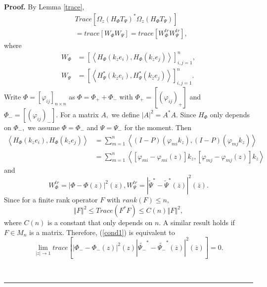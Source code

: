 \documentclass{article}%
\newenvironment{proof}[1][Proof]{\noindent\textbf{#1.} }{\ \rule{0.5em}{0.5em}}
\begin{document}
\begin{proof}
By Lemma \ref{trace},
\begin{align*}
&  Trace\left[  \Omega_{z}(H_{\Phi}T_{\Psi})^{\ast}\Omega_{z}(H_{\Phi}T_{\Psi
})\right] \\
&  =trace\left[  W_{\Phi}W_{\Psi}\right]  =trace\left[  W_{\Phi}^{tr}W_{\Psi
}^{tr}\right]  ,
\end{align*}
where%
\begin{align*}
W_{\Phi}  &  =\left[  \left\langle H_{\Phi}\left(  k_{z}e_{i}\right)
,H_{\Phi}\left(  k_{z}e_{j}\right)  \right\rangle \right]  _{i,j=1}^{n},\\
W_{\Psi}  &  =\left[  \left\langle H_{\Psi}^{\ast}\left(  k_{\overline{z}%
}e_{i}\right)  ,H_{\Psi}^{\ast}\left(  k_{\overline{z}}e_{j}\right)
\right\rangle \right]  _{i,j=1}^{n}.
\end{align*}
Write $\Phi=\left[  \varphi_{ij}\right]  _{n\times n}$ as $\Phi=\Phi_{+}%
+\Phi_{-}$ with $\Phi_{+}=\left[  \left(  \varphi_{ij}\right)  _{+}\right]  $
and $\Phi_{-}=\left[  \left(  \varphi_{ij}\right)  _{-}\right]  .$ For a
matrix $A,$ we define $\left\vert A\right\vert ^{2}=A^{\ast}A.$ Since
$H_{\Phi}$ only depends on $\Phi_{-},$ we assume $\Phi=\Phi_{-}$ and
$\Psi=\Psi_{-}$ for the moment. Then%
\begin{align*}
\left\langle H_{\Phi}\left(  k_{z}e_{i}\right)  ,H_{\Phi}\left(  k_{z}%
e_{j}\right)  \right\rangle  &  =\sum_{m=1}^{n}\left\langle (I-P)\left(
\varphi_{mi}k_{z}\right)  ,(I-P)\left(  \varphi_{mj}k_{z}\right)
\right\rangle \\
&  =\sum_{m=1}^{n}\left\langle \left[  \varphi_{mi}-\varphi_{mi}(z)\right]
k_{z},\left[  \varphi_{mj}-\varphi_{mj}(z)\right]  k_{z}\right\rangle
\end{align*}
and
\[
W_{\Phi}^{tr}=\left\vert \Phi-\Phi(z)\right\vert ^{2}(z),W_{\Psi}%
^{tr}=\left\vert \widetilde{\Psi}^{\ast}-\widetilde{\Psi}^{\ast}(\overline
{z})\right\vert ^{2}(\overline{z}).
\]
Since for a finite rank operator $F$ with $rank(F)\leq n,$
\[
\left\Vert F\right\Vert ^{2}\leq Trace(F^{\ast}F)\leq C(n)\left\Vert
F\right\Vert ^{2},
\]
where $C(n)$ is a constant that only depends on $n.$ A similar result holds if
$F\in M_{n}$ is a matrix. Therefore, (\ref{cond1}) is equivalent to
\[
\lim_{\left\vert z\right\vert \rightarrow1}trace\left[  \left\vert \Phi
_{-}-\Phi_{-}(z)\right\vert ^{2}(z)\left\vert \widetilde{\Psi_{-}}^{\ast
}-\widetilde{\Psi_{-}}^{\ast}(\overline{z})\right\vert ^{2}(\overline
{z})\right]  =0.
\]



\end{proof}
\end{document}
